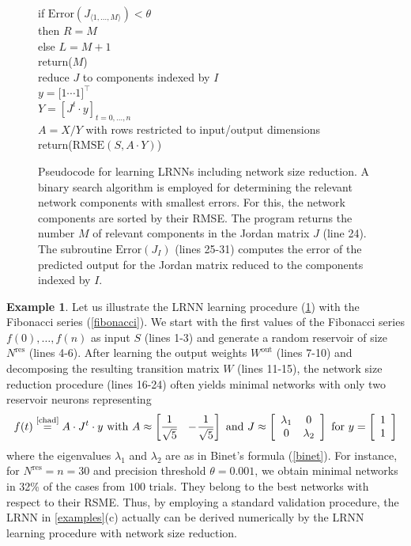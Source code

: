\documentclass{sn-jnl}
\theoremstyle{definition}
\newtheorem{exmp}{Example}
\begin{document}
\begin{figure}
\begin{algorithmic}[1]
	\quad if $\mathrm{Error}(J_{\langle 1,\dots,M \rangle}) < \theta$\\
	\qquad then $R = M$\\
	\qquad else $L = M+1$\\
	return\big($M$\big)\newline
	\\
	\quad reduce $J$ to components indexed by $I$\\
	\quad $y = \big[ 1 \cdots 1 \big]^\top$\\
	\quad $Y = \left[J^t \cdot y\right]_{t=0,\dots,n}$ \\
	\quad $A = X/Y$ with rows restricted to input/output dimensions\\
	return\big($\mathrm{RMSE}(S,A \cdot Y)$\big)
\end{algorithmic}
\caption{Pseudocode for learning LRNNs including network size reduction. A
binary search algorithm is employed for determining the relevant network
components with smallest errors. For this, the network components are sorted by
their RMSE. The program returns the number $M$ of relevant components in the
Jordan matrix $J$ (line 24). The subroutine $\mathrm{Error}(J_I)$ (lines 25-31)
computes the error of the predicted output for the Jordan matrix reduced to the
components indexed by $I$.}
\label{proc}
\end{figure}

\begin{exmp}\label{continued}
Let us illustrate the LRNN learning procedure (\cref{proc}) with the Fibonacci
series (\cref{fibonacci}). We start with the first values of the Fibonacci
series $f(0),\dots,f(n)$ as input $S$ (lines 1-3) and generate a random
reservoir of size $N^\mathrm{res}$ (lines 4-6). After learning the output
weights $W^\mathrm{out}$ (lines 7-10) and decomposing the resulting transition
matrix $W$ (lines 11-15), the network size reduction procedure (lines 16-24)
often yields minimal networks with only two reservoir neurons representing
\[
    f(t) \overset{\text{\cref{chad}}}{=} A \cdot J^t \cdot y \text{~with~}
	A \approx \left[ \frac{1}{\sqrt{5}} ~~ -\!\frac{1}{\sqrt{5}} \right] \text{~and~}
	J \approx \left[ \begin{array}{cc}
		\lambda_1 & 0\\
		0 & \lambda_2
   	\end{array} \right] \text{~for~}
	y = \left[ \begin{array}{c}
	1\\
	1
   \end{array} \right]
\]
where the eigenvalues $\lambda_1$ and $\lambda_2$ are as in Binet's formula
(\cref{binet}). For instance, for $N^\mathrm{res}=n=30$ and precision threshold
$\theta=0.001$, we obtain minimal networks in 32\% of the cases from $100$
trials. They belong to the best networks with respect to their RSME. Thus,
by employing a standard validation procedure, the LRNN in \cref{examples}(c)
actually can be derived numerically by the LRNN learning procedure with network
size reduction.
\end{exmp}
\end{document}
